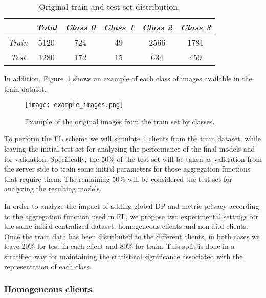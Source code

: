 \documentclass[5p,times]{elsarticle}
\begin{document}
\begin{table}[ht]
    \centering
    \begin{tabular}{cccccc}
    \toprule
         & \textit{\textbf{Total}} & \textit{\textbf{Class 0}} & \textit{\textbf{Class 1}} & \textit{\textbf{Class 2}} & \textit{\textbf{Class 3}} \\
         \midrule
         \textit{Train} & 5120 & 724 & 49 & 2566 & 1781 \\
         \textit{Test} & 1280 & 172 & 15 & 634 & 459 \\
    \bottomrule
    \end{tabular}
    \caption{Original train and test set distribution.}
    \label{tab:original_data}
\end{table}

In addition, Figure~\ref{fig:example_images} shows an example of each class of images available in the train dataset.

\begin{figure}[ht]
    \centering
    \texttt{[image: example\_images.png]}
    \caption{Example of the original images from the train set by classes.}
    \label{fig:example_images}
\end{figure}

To perform the FL scheme we will simulate 4 clients from the train dataset, while leaving the initial test set for analyzing the performance of the final models and for validation. Specifically, the 50$\%$ of the test set will be taken as validation from the server side to train some initial parameters for those aggregation functions that require them. The remaining 50$\%$ will be considered the test set for analyzing the resulting models.

In order to analyze the impact of adding global-DP and metric privacy according to the aggregation function used in FL, we propose two experimental settings for the same initial centralized dataset: homogeneous clients and non-i.i.d clients. Once the train data has been distributed to the different clients, in both cases we leave 20$\%$ for test in each client and 80$\%$ for train. This split is done in a stratified way for maintaining the statistical significance associated with the representation of each class.

\subsubsection{Homogeneous clients}\label{sec:clients_iid}
\end{document}
